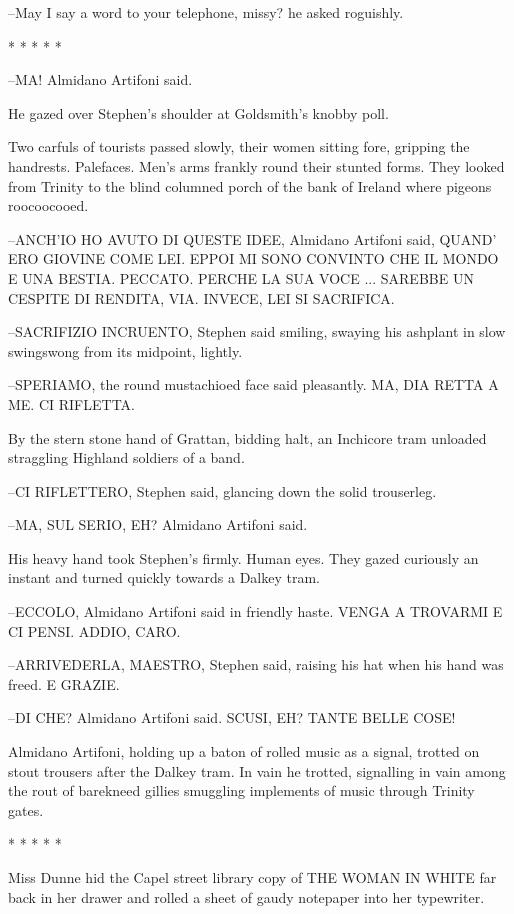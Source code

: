 --May I say a word to your telephone, missy? he asked roguishly.


    * * * * *


--MA! Almidano Artifoni said.

He gazed over Stephen's shoulder at Goldsmith's knobby poll.

Two carfuls of tourists passed slowly,
their women sitting fore,
gripping the handrests. Palefaces. Men's arms frankly round their stunted
forms. They looked from Trinity to the blind columned porch of the bank
of Ireland where pigeons roocoocooed.

--ANCH'IO HO AVUTO DI QUESTE IDEE, Almidano Artifoni said, QUAND' ERO
GIOVINE COME LEI. EPPOI MI SONO CONVINTO CHE IL MONDO E UNA BESTIA.
PECCATO. PERCHE LA SUA VOCE ... SAREBBE UN CESPITE DI RENDITA, VIA.
INVECE, LEI SI SACRIFICA.

--SACRIFIZIO INCRUENTO, Stephen said smiling, swaying his ashplant in slow
swingswong from its midpoint, lightly.

--SPERIAMO, the round mustachioed face said pleasantly.
MA, DIA RETTA A ME. CI RIFLETTA.

By the stern stone hand of Grattan, bidding halt, an Inchicore tram
unloaded straggling Highland soldiers of a band.

--CI RIFLETTERO, Stephen said, glancing down the solid trouserleg.

--MA, SUL SERIO, EH? Almidano Artifoni said.

His heavy hand took Stephen's firmly. Human eyes. They gazed
curiously an instant and turned quickly towards a Dalkey tram.

--ECCOLO, Almidano Artifoni said in friendly haste. VENGA A TROVARMI E CI
PENSI. ADDIO, CARO.

--ARRIVEDERLA, MAESTRO, Stephen said,
raising his hat when his hand was freed.
E GRAZIE.

--DI CHE? Almidano Artifoni said. SCUSI, EH? TANTE BELLE COSE!

Almidano Artifoni, holding up a baton of rolled music as a signal,
trotted on stout trousers after the Dalkey tram. In vain he trotted,
signalling in vain among the rout of barekneed gillies smuggling
implements of music through Trinity gates.


    * * * * *


Miss Dunne hid the Capel street library copy of THE WOMAN IN WHITE
far back in her drawer and rolled a sheet of gaudy notepaper into her
typewriter.%

